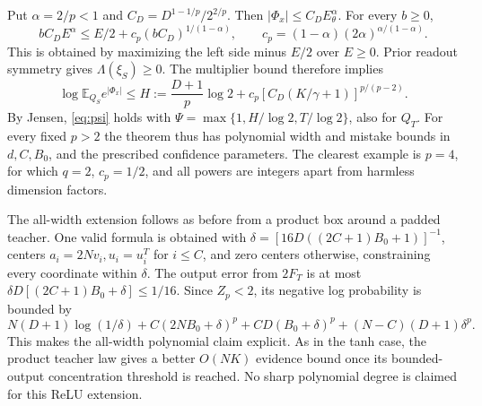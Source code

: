\documentclass[11pt]{article}
\newcommand{\E}{\mathbb E}
\begin{document}
Put $\alpha=2/p<1$ and $C_D=D^{1-1/p}/2^{2/p}$. Then
$|\Phi_x|\le C_D E_\theta^\alpha$. For every $b\ge0$,
\[
 b C_D E^\alpha\le E/2+c_p(bC_D)^{1/(1-\alpha)},\qquad
 c_p=(1-\alpha)(2\alpha)^{\alpha/(1-\alpha)}.
\]
This is obtained by maximizing the left side minus $E/2$ over $E\ge0$.
Prior readout symmetry gives $\Lambda(\xi_S)\ge0$. The multiplier
bound therefore implies
\[
 \log\E_{Q_S}e^{|\Phi_x|}
 \le H:=\frac{D+1}{p}\log2+
 c_p\left[C_D(K/\gamma+1)\right]^{p/(p-2)}.
\]
By Jensen, \eqref{eq:psi} holds with
$\Psi=\max\{1,H/\log2,T/\log2\}$, also for $Q_T$. For every fixed
$p>2$ the theorem thus has polynomial width and mistake bounds in
$d,C,B_0$, and the prescribed confidence parameters. The clearest
example is $p=4$, for which $q=2$, $c_p=1/2$, and all powers are integers
apart from harmless dimension factors.

The all-width extension follows as before from a product box around
a padded teacher. One valid formula is obtained with
$\delta=[16D((2C+1)B_0+1)]^{-1}$, centers $a_i=2Nv_i,u_i=u_i^T$
for $i\le C$, and zero centers otherwise, constraining every coordinate
within $\delta$. The output error from $2F_T$ is at most
$\delta D[(2C+1)B_0+\delta]\le1/16$. Since $Z_p<2$, its negative
log probability is bounded by
\[
 N(D+1)\log(1/\delta)+C(2NB_0+\delta)^p
 +CD(B_0+\delta)^p+(N-C)(D+1)\delta^p.
\]
This makes the all-width polynomial claim explicit. As in the tanh case,
the product teacher law gives a better $O(NK)$ evidence bound once its
bounded-output concentration threshold is reached. No sharp polynomial
degree is claimed for this ReLU extension.
\end{document}
